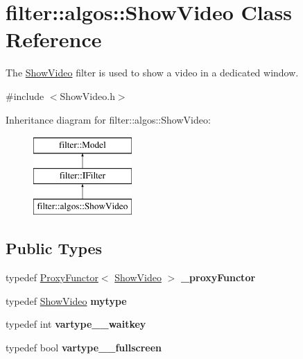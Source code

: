 \hypertarget{classfilter_1_1algos_1_1_show_video}{}\section{filter\+:\+:algos\+:\+:Show\+Video Class Reference}
\label{classfilter_1_1algos_1_1_show_video}


The \hyperlink{classfilter_1_1algos_1_1_show_video}{Show\+Video} filter is used to show a video in a dedicated window.  




{\ttfamily \#include $<$Show\+Video.\+h$>$}

Inheritance diagram for filter\+:\+:algos\+:\+:Show\+Video\+:\begin{figure}[H]
\begin{center}
\leavevmode
\includegraphics[height=3.000000cm]{d9/de7/classfilter_1_1algos_1_1_show_video}
\end{center}
\end{figure}
\subsection*{Public Types}
\begin{DoxyCompactItemize}
\item 
\mbox{\label{classfilter_1_1algos_1_1_show_video_a69452cd13f091d8be3320c7089a2d9bf}} 
typedef \hyperlink{class_proxy_functor}{Proxy\+Functor}$<$ \hyperlink{classfilter_1_1algos_1_1_show_video}{Show\+Video} $>$ {\bfseries \+\_\+proxy\+Functor}
\item 
\mbox{\label{classfilter_1_1algos_1_1_show_video_a21e22297c0e371bc0dae81a7a67ed6e3}} 
typedef \hyperlink{classfilter_1_1algos_1_1_show_video}{Show\+Video} {\bfseries mytype}
\item 
\mbox{\label{classfilter_1_1algos_1_1_show_video_af69bc20ca3fa2f7cf4509de471d706ed}} 
typedef int {\bfseries vartype\+\_\+\+\_\+waitkey}
\item 
\mbox{\label{classfilter_1_1algos_1_1_show_video_a0ab89f7e3b0b613611a67b9c2dffd90b}} 
typedef bool {\bfseries vartype\+\_\+\+\_\+fullscreen}
\end{DoxyCompactItemize}

